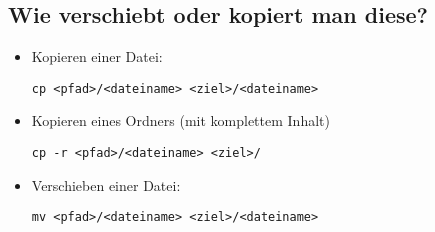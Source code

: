 \documentclass[a4paper,10pt]{article}
\begin{document}
\subsection{Wie verschiebt oder kopiert man diese?}
\begin{itemize} 
\item Kopieren einer Datei: 
\begin{lstlisting}
cp <pfad>/<dateiname> <ziel>/<dateiname>
\end{lstlisting} 
\item Kopieren eines Ordners (mit komplettem Inhalt)
\begin{lstlisting}
cp -r <pfad>/<dateiname> <ziel>/
\end{lstlisting} 
\item Verschieben einer Datei:
\begin{lstlisting}
mv <pfad>/<dateiname> <ziel>/<dateiname>
\end{lstlisting} 
\end{itemize}
\end{document}
